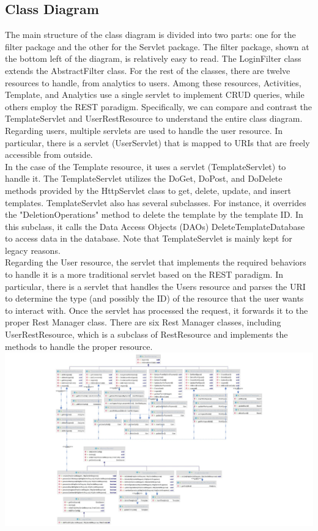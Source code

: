 \subsection{Class Diagram}


The main structure of the class diagram is divided into two parts: one for the filter package and the other for the Servlet package. The filter package, shown at the bottom left of the diagram, is relatively easy to read. The LoginFilter class extends the AbstractFilter class. For the rest of the classes, there are twelve resources to handle, from analytics to users. Among these resources, Activities, Template, and Analytics use a single servlet to implement CRUD queries, while others employ the REST paradigm. Specifically, we can compare and contrast the TemplateServlet and UserRestResource to understand the entire class diagram.\\

Regarding users, multiple servlets are used to handle the user resource. In particular, there is a servlet (UserServlet) that is mapped to URIs that are freely accessible from outside.\\

In the case of the Template resource, it uses a servlet (TemplateServlet) to handle it. The TemplateServlet utilizes the DoGet, DoPost, and DoDelete methods provided by the HttpServlet class to get, delete, update, and insert templates. TemplateServlet also has several subclasses. For instance, it overrides the "DeletionOperations" method to delete the template by the template ID. In this subclass, it calls the Data Access Objects (DAOs) DeleteTemplateDatabase to access data in the database. Note that TemplateServlet is mainly kept for legacy reasons.\\

Regarding the User resource, the servlet that implements the required behaviors to handle it is a more traditional servlet based on the REST paradigm. In particular, there is a servlet that handles the Users resource and parses the URI to determine the type (and possibly the ID) of the resource that the user wants to interact with. Once the servlet has processed the request, it forwards it to the proper Rest Manager class. There are six Rest Manager classes, including UserRestResource, which is a subclass of RestResource and implements the methods to handle the proper resource.\\
\includegraphics[width=1.30\columnwidth]{WA-workflix-HW1/images/class sequence.jpg}\\

